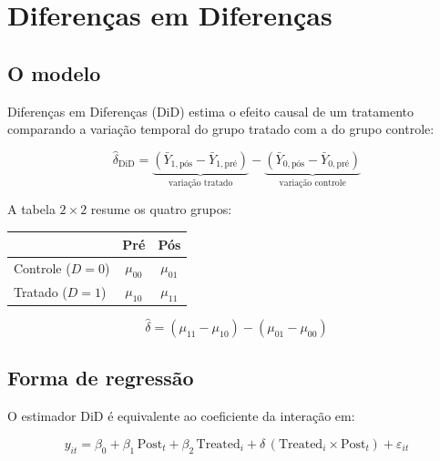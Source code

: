 \chapter{Diferenças em Diferenças}
\label{cap:did}

\section{O modelo}

Diferenças em Diferenças (DiD) estima o efeito causal de um tratamento
comparando a variação temporal do grupo tratado com a do grupo controle:

\[
  \hat\delta_{\mathrm{DiD}}
  = \underbrace{(\bar{Y}_{1,\text{pós}} - \bar{Y}_{1,\text{pré}})}_{\text{variação tratado}}
  - \underbrace{(\bar{Y}_{0,\text{pós}} - \bar{Y}_{0,\text{pré}})}_{\text{variação controle}}
\]

A tabela $2\times 2$ resume os quatro grupos:

\begin{center}
\begin{tabular}{lcc}
\toprule
 & \textbf{Pré} & \textbf{Pós} \\
\midrule
Controle ($D=0$) & $\mu_{00}$ & $\mu_{01}$ \\
Tratado  ($D=1$) & $\mu_{10}$ & $\mu_{11}$ \\
\bottomrule
\end{tabular}
\end{center}

\[
  \hat\delta = (\mu_{11} - \mu_{10}) - (\mu_{01} - \mu_{00})
\]

\section{Forma de regressão}

O estimador DiD é equivalente ao coeficiente da interação em:

\[
  y_{it} = \beta_0 + \beta_1\,\text{Post}_t + \beta_2\,\text{Treated}_i
           + \delta\,(\text{Treated}_i \times \text{Post}_t) + \varepsilon_{it}
\]

